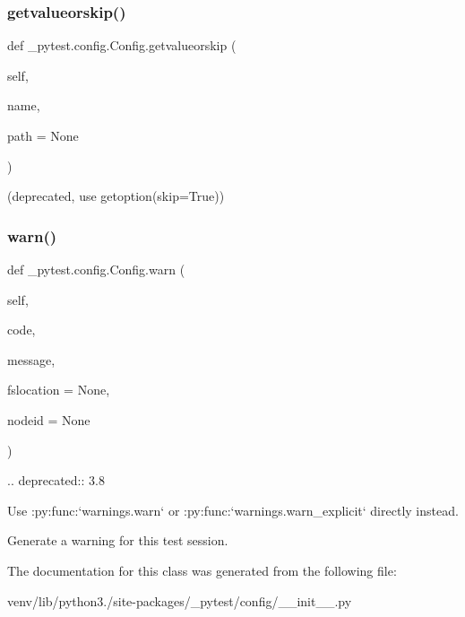 \subsubsection{\texorpdfstring{getvalueorskip()}{getvalueorskip()}}
{\footnotesize\ttfamily def \+\_\+pytest.\+config.\+Config.\+getvalueorskip (\begin{DoxyParamCaption}\item[{}]{self,  }\item[{}]{name,  }\item[{}]{path = {\ttfamily None} }\end{DoxyParamCaption})}

\begin{DoxyVerb}(deprecated, use getoption(skip=True)) \end{DoxyVerb}
 \mbox{\label{class__pytest_1_1config_1_1_config_a8190b2a08b33a99d6f6a2cb561ea7216}} 
\subsubsection{\texorpdfstring{warn()}{warn()}}
{\footnotesize\ttfamily def \+\_\+pytest.\+config.\+Config.\+warn (\begin{DoxyParamCaption}\item[{}]{self,  }\item[{}]{code,  }\item[{}]{message,  }\item[{}]{fslocation = {\ttfamily None},  }\item[{}]{nodeid = {\ttfamily None} }\end{DoxyParamCaption})}

\begin{DoxyVerb}.. deprecated:: 3.8

    Use :py:func:`warnings.warn` or :py:func:`warnings.warn_explicit` directly instead.

Generate a warning for this test session.
\end{DoxyVerb}
 

The documentation for this class was generated from the following file\+:\begin{DoxyCompactItemize}
\item 
venv/lib/python3./site-\/packages/\+\_\+pytest/config/\+\_\+\+\_\+init\+\_\+\+\_\+.\+py\end{DoxyCompactItemize}
